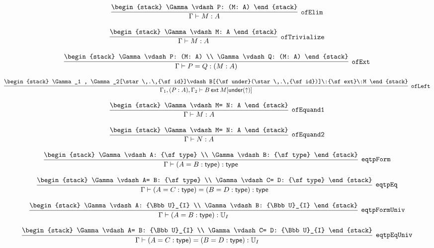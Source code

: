\[
\infer[{\tt ofElim}]{\Gamma \vdash M: A}{
\begin{stack}
\Gamma \vdash P: (M: A)
\end{stack}}
\]

\[
\infer[{\tt ofTrivialize}]{\Gamma \vdash M: A}{
\begin{stack}
\Gamma \vdash M: A
\end{stack}}
\]

\[
\infer[{\tt ofExt}]{\Gamma \vdash P= Q: (M: A)}{
\begin{stack}
\Gamma \vdash P: (M: A)
\\
\Gamma \vdash Q: (M: A)
\end{stack}}
\]

\[
\infer[{\tt ofLeft}]{\Gamma_1 ,(P: A), \Gamma_2 \vdash B\:{\sf ext}\:M[{\sf under}(\uparrow )]}{
\begin{stack}
\Gamma_1 , \Gamma_2[\star \,.\,{\sf id}]\vdash B[{\sf under}(\star \,.\,{\sf id})]\:{\sf ext}\:M
\end{stack}}
\]

\[
\infer[{\tt ofEquand1}]{\Gamma \vdash M: A}{
\begin{stack}
\Gamma \vdash M= N: A
\end{stack}}
\]

\[
\infer[{\tt ofEquand2}]{\Gamma \vdash N: A}{
\begin{stack}
\Gamma \vdash M= N: A
\end{stack}}
\]

\[
\infer[{\tt eqtpForm}]{\Gamma \vdash (A= B: {\sf type}): {\sf type}}{
\begin{stack}
\Gamma \vdash A: {\sf type}
\\
\Gamma \vdash B: {\sf type}
\end{stack}}
\]

\[
\infer[{\tt eqtpEq}]{\Gamma \vdash (A= C: {\sf type})= (B= D: {\sf type}): {\sf type}}{
\begin{stack}
\Gamma \vdash A= B: {\sf type}
\\
\Gamma \vdash C= D: {\sf type}
\end{stack}}
\]

\[
\infer[{\tt eqtpFormUniv}]{\Gamma \vdash (A= B: {\sf type}): {\Bbb U}_{I}}{
\begin{stack}
\Gamma \vdash A: {\Bbb U}_{I}
\\
\Gamma \vdash B: {\Bbb U}_{I}
\end{stack}}
\]

\[
\infer[{\tt eqtpEqUniv}]{\Gamma \vdash (A= C: {\sf type})= (B= D: {\sf type}): {\Bbb U}_{I}}{
\begin{stack}
\Gamma \vdash A= B: {\Bbb U}_{I}
\\
\Gamma \vdash C= D: {\Bbb U}_{I}
\end{stack}}
\]

